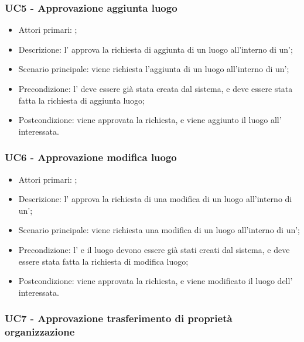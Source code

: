 \documentclass[../analisi-dei-requisiti]{subfiles}
\begin{document}
\subsubsection{UC5 - Approvazione aggiunta luogo}
\label{subsub:UC5}

\begin{itemize}
\item Attori primari: ;
\item Descrizione: l' approva la richiesta di aggiunta di un luogo all'interno di un';
\item Scenario principale: viene richiesta l'aggiunta di un luogo all'interno di un';
\item Precondizione: l' deve essere già stata creata dal sistema, e deve essere stata fatta la richiesta di aggiunta luogo;
\item Postcondizione: viene approvata la richiesta, e viene aggiunto il luogo all' interessata.

\end{itemize}
\subsubsection{UC6 - Approvazione modifica luogo}
\label{subsub:UC6}

\begin{itemize}
\item Attori primari: ;
\item Descrizione: l' approva la richiesta di una modifica di un luogo all'interno di un';
\item Scenario principale: viene richiesta una modifica di un luogo all'interno di un';
\item Precondizione: l' e il luogo devono essere già stati creati dal sistema, e deve essere stata fatta la richiesta di modifica luogo;
\item Postcondizione: viene approvata la richiesta, e viene modificato il luogo dell' interessata.

\end{itemize}
\subsubsection{UC7 - Approvazione trasferimento di proprietà organizzazione}
\label{subsub:UC7}
\end{document}
